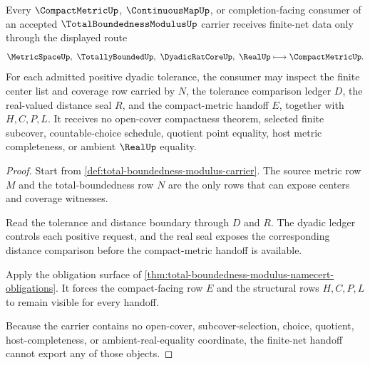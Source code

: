 \begin{theorem}
\label{thm:total-boundedness-modulus-finite-net-handoff}
Every $\CompactMetricUp$, $\ContinuousMapUp$, or completion-facing consumer of an accepted $\TotalBoundednessModulusUp$ carrier receives finite-net data only through the displayed route
$$
\MetricSpaceUp,\ \TotallyBoundedUp,\ \DyadicRatCoreUp,\ \RealUp
\longmapsto
\CompactMetricUp .
$$
For each admitted positive dyadic tolerance, the consumer may inspect the finite center list and coverage row carried by $N$, the tolerance comparison ledger $D$, the real-valued distance seal $R$, and the compact-metric handoff $E$, together with $H,C,P,L$. It receives no open-cover compactness theorem, selected finite subcover, countable-choice schedule, quotient point equality, host metric completeness, or ambient $\RealUp$ equality.
\end{theorem}
\begin{proof}
Start from \autoref{def:total-boundedness-modulus-carrier}. The source metric row $M$ and the total-boundedness row $N$ are the only rows that can expose centers and coverage witnesses.

Read the tolerance and distance boundary through $D$ and $R$. The dyadic ledger controls each positive request, and the real seal exposes the corresponding distance comparison before the compact-metric handoff is available.

Apply the obligation surface of \autoref{thm:total-boundedness-modulus-namecert-obligations}. It forces the compact-facing row $E$ and the structural rows $H,C,P,L$ to remain visible for every handoff.

Because the carrier contains no open-cover, subcover-selection, choice, quotient, host-completeness, or ambient-real-equality coordinate, the finite-net handoff cannot export any of those objects.
\end{proof}

